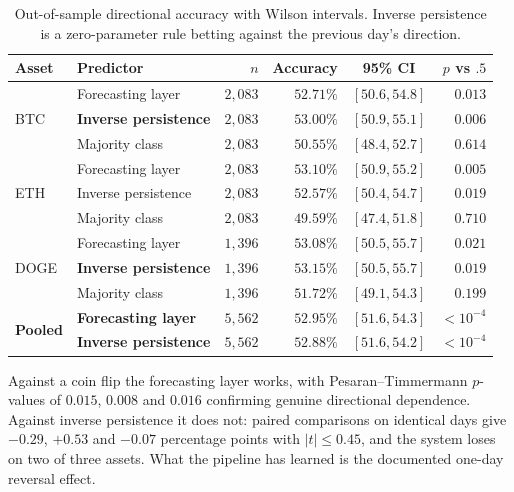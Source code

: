 \documentclass[preprint,12pt,authoryear]{elsarticle}
\begin{document}
\begin{table}[t]\centering\small
\caption{Out-of-sample directional accuracy with Wilson intervals. Inverse
persistence is a zero-parameter rule betting against the previous day's
direction.}
\label{tab:acc}
\begin{tabular}{@{}llrrcr@{}}
\toprule
Asset & Predictor & $n$ & Accuracy & 95\% CI & $p$ vs $.5$ \\
\midrule
\multirow{3}{*}{BTC}
 & Forecasting layer            & $2{,}083$ & $52.71\%$ & $[50.6, 54.8]$ & $0.013$ \\
 & \textbf{Inverse persistence} & $2{,}083$ & $\mathbf{53.00\%}$ & $[50.9, 55.1]$ & $0.006$ \\
 & Majority class               & $2{,}083$ & $50.55\%$ & $[48.4, 52.7]$ & $0.614$ \\
\midrule
\multirow{3}{*}{ETH}
 & Forecasting layer            & $2{,}083$ & $53.10\%$ & $[50.9, 55.2]$ & $0.005$ \\
 & Inverse persistence          & $2{,}083$ & $52.57\%$ & $[50.4, 54.7]$ & $0.019$ \\
 & Majority class               & $2{,}083$ & $49.59\%$ & $[47.4, 51.8]$ & $0.710$ \\
\midrule
\multirow{3}{*}{DOGE}
 & Forecasting layer            & $1{,}396$ & $53.08\%$ & $[50.5, 55.7]$ & $0.021$ \\
 & \textbf{Inverse persistence} & $1{,}396$ & $\mathbf{53.15\%}$ & $[50.5, 55.7]$ & $0.019$ \\
 & Majority class               & $1{,}396$ & $51.72\%$ & $[49.1, 54.3]$ & $0.199$ \\
\midrule
\multirow{2}{*}{\textbf{Pooled}}
 & \textbf{Forecasting layer}   & $5{,}562$ & $\mathbf{52.95\%}$ & $[51.6, 54.3]$ & $<10^{-4}$ \\
 & \textbf{Inverse persistence} & $5{,}562$ & $\mathbf{52.88\%}$ & $[51.6, 54.2]$ & $<10^{-4}$ \\
\bottomrule
\end{tabular}
\end{table}

Against a coin flip the forecasting layer works, with Pesaran--Timmermann
$p$-values of $0.015$, $0.008$ and $0.016$ confirming genuine directional
dependence. Against inverse persistence it does not: paired comparisons on
identical days give $-0.29$, $+0.53$ and $-0.07$ percentage points with
$|t| \le 0.45$, and the system loses on two of three assets. What the pipeline
has learned is the documented one-day reversal effect.
\end{document}
